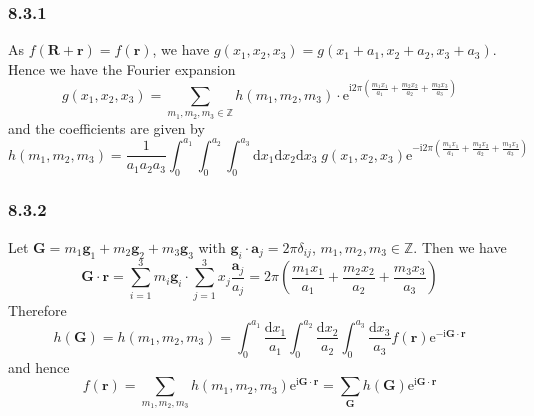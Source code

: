 \documentclass[]{ctexart}
\begin{document}
\subsubsection*{8.3.1} As $f(\mathbf R+\mathbf r)=f(\mathbf r)$, we have $g(x_1,x_2,x_3)=g(x_1+a_1,x_2+a_2,x_3+a_3)$. Hence we have the Fourier expansion 
\begin{equation*}
g(x_1,x_2,x_3)=\sum_{m_1,m_2,m_3\in\mathbb Z}h(m_1,m_2,m_3)\cdot\mathrm{e}^{\mathrm{i}2\pi\left(\frac{m_1x_1}{a_1}+\frac{m_2x_2}{a_2}+\frac{m_3x_3}{a_3}\right)}
\end{equation*}
and the coefficients are given by 
\begin{equation*}
h(m_1,m_2,m_3)=\frac{1}{a_1a_2a_3}\int_0^{a_1}\int_0^{a_2}\int_0^{a_3}\mathrm{d}x_1\mathrm{d}x_2\mathrm{d}x_3\;g(x_1,x_2,x_3)\mathrm{e}^{-\mathrm{i}2\pi\left(\frac{m_1x_1}{a_1}+\frac{m_2x_2}{a_2}+\frac{m_3x_3}{a_3}\right)}
\end{equation*}

\subsubsection*{8.3.2} Let $\mathbf G=m_1\mathbf g_1+m_2\mathbf g_2+m_3\mathbf g_3$ with $\mathbf g_i\cdot\mathbf a_j=2\pi\delta_{ij}$, $m_1,m_2,m_3\in\mathbb Z$. 
Then we have 
\begin{equation*}
\mathbf G\cdot\mathbf r=\sum_{i=1}^3m_i\mathbf g_i\cdot\sum_{j=1}^3 x_j\frac{\mathbf a_j}{a_j}=2\pi\left(\frac{m_1x_1}{a_1}+\frac{m_2x_2}{a_2}+\frac{m_3x_3}{a_3}\right)
\end{equation*}
Therefore 
\begin{equation*}
h(\mathbf G)=h(m_1,m_2,m_3)=\int_0^{a_1}\frac{\mathrm{d}x_1}{a_1}\int_0^{a_2}\frac{\mathrm{d}x_2}{a_2}\int_0^{a_3}\frac{\mathrm{d}x_3}{a_3}f(\mathbf r)\mathrm{e}^{-\mathrm{i}\mathbf G\cdot\mathbf r}
\end{equation*}
and hence 
\begin{equation*}
f(\mathbf r)=\sum_{m_1,m_2,m_3}h(m_1,m_2,m_3)\mathrm{e}^{\mathrm{i}\mathbf G\cdot\mathbf r}=\sum_{\mathbf G}h(\mathbf G)\mathrm{e}^{\mathrm{i}\mathbf G\cdot\mathbf r}
\end{equation*}
\end{document}
